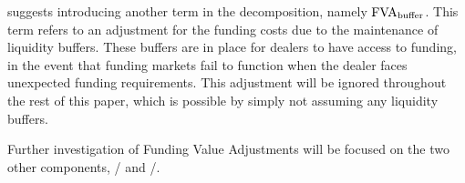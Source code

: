 \documentclass[main.tex]{subfiles}
\begin{document}
        \textcite{KPMGFVA} suggests introducing another term in the decomposition, namely
        $\FVA/_{\text{buffer}}$.
        This term refers to an adjustment for the funding costs
        due to the maintenance of liquidity buffers. 
        These buffers are in place for dealers to have access to funding, in the event
        that funding markets fail to function when the dealer faces unexpected funding requirements.
        This adjustment will be ignored throughout the rest of this paper, 
        which is possible by simply not assuming any liquidity buffers. 
        
        Further investigation of Funding Value Adjustments will be focused on the two other components,
        \FCA/ and \FBA/.
\end{document}
